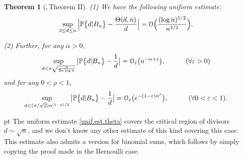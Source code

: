 \documentclass[11pt,draft,reqno]{amsart}
\newtheorem{theorem}{Theorem}[section]
\theoremstyle{definition}
\theoremstyle{remarks}
\numberwithin{equation}{section}
\def \a{{\alpha}}
\def \e{{\varepsilon}}
\def \qq{{\qquad}}
\def\P{{\mathcal P}}
\def\P{{\mathbb P}}
\begin{document}
  \begin{theorem}[\cite{W1},\,Theorem II]\label{estPdlBn} 
{  \rm (1)}    We have the following uniform estimate: 
\begin{equation}\label{unif.est.theta}\sup_{2\le d\le n}\Big|\P\big\{d|B_n\big\}- {\Theta(d,n)\over d}  \Big|= {\mathcal O}\Big(\frac{(\log n)^{5/2}}{n^{3/2}}\Big).  
\end{equation}
 
  

 
{  \rm (2)} Further,
  for any $\a>0$,  
\begin{equation}\label{unif.est.theta.alpha} \sup_{d<  \pi   \sqrt{   n \over 2\a\log n}}\big|\P\big\{  d|   B_{ n} \big\}-{1\over d} 
\big|= {\mathcal O}_\e\big(n^{-\a+\e }\big),\qq \quad (\forall \e>0)  
\end{equation}   
 and for any $0<\rho<1 $, 
\begin{equation}\label{unif.est.theta.rho}  \sup_{d<  (\pi/\sqrt 2) n^{(1-\rho)/2} }\big|\P\big\{  d|   B_{ n} \big\}-{1\over d} 
\big|= {\mathcal O}_\e\big(e^{-(1-\e) n^\rho}\big),\qq \quad (\forall 0<\e<1). 
\end{equation} 
 \end{theorem} 
 pt The uniform estimate \eqref{unif.est.theta} covers the   critical region of divisors $d\sim \sqrt n$, and   we don't know  any  other   estimate of this kind covering this case.   This estimate  also admits a version  for binomial sums, which follows by simply copying the proof made in the Bernoulli case.
 
\end{document}
